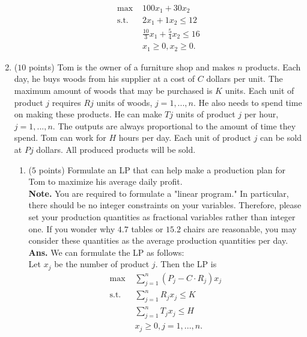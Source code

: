\documentclass[12pt]{article}
\begin{document}
\begin{enumerate}
          \begin{align*}
              \text{max }  & 100x_1+30x_2                           \\
              \text{s.t. } & 2x_1+1x_2 \leq 12                      \\
                           & \frac{10}{3}x_1+\frac{5}{4}x_2 \leq 16 \\
                           & x_1 \geq0, x_2 \geq 0.
          \end{align*}
    \item ($10$ points) Tom is the owner of a furniture shop and makes $n$ products. Each day, he buys woods from his supplier at a cost of $C$ dollars per unit. The maximum amount of woods that may be purchased is $K$ units. Each unit of product $j$ requires $Rj$ units of woods, $j = 1, ..., n$. He also needs to spend time on making these products. He can make $Tj$ units of product $j$ per hour, $j = 1, ..., n.$ The outputs are always proportional to the amount of time they spend. Tom can work for $H$ hours per day. Each unit of product $j$ can be sold at $Pj$ dollars. All produced products will be sold.
          \begin{enumerate}
              \item ($5$ points) Formulate an LP that can help make a production plan for Tom to maximize his average daily profit.\\
                    \textbf{Note.} You are required to formulate a "linear program." In particular, there should be no integer constraints on your variables. Therefore, please set your production quantities as fractional variables rather than integer one. If you wonder why $4.7$ tables or $15.2$ chairs are reasonable, you may consider these quantities as the average production quantities per day.\\
                    \textbf{Ans.}
                    We can formulate the LP as follows:\\
                    Let $x_j$ be the number of product $j$. Then the LP is
                    \begin{align*}
                        \text{max }  & \sum_{j=1}^{n} (P_j-C\cdot R_j)x_j \\
                        \text{s.t. } & \sum_{j=1}^{n} R_jx_j \leq K       \\
                                     & \sum_{j=1}^{n} T_jx_j \leq H       \\
                                     & x_j \geq 0, j = 1, ..., n.
                    \end{align*}

\end{enumerate}
\end{enumerate}
\end{document}
